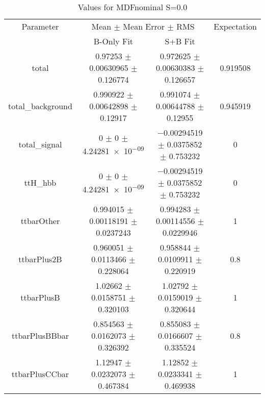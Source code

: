 \begin{table}
\centering
\caption{Values for MDFnominal S=0.0}
\begin{tabular}{cccc}
\toprule
Parameter & \multicolumn{2}{c}{Mean $\pm$ Mean Error $\pm$ RMS} & Expectation\\
 & B-Only Fit & S+B Fit & \\
\midrule
total & \num{0.97253} $\pm$ \num{0.00630965} $\pm$ \num{0.126774} & \num{0.972625} $\pm$ \num{0.00630383} $\pm$ \num{0.126657} & \num{0.919508}\\
total\_background & \num{0.990922} $\pm$ \num{0.00642898} $\pm$ \num{0.12917} & \num{0.991074} $\pm$ \num{0.00644788} $\pm$ \num{0.12955} & \num{0.945919}\\
total\_signal & \num{0} $\pm$ \num{0} $\pm$ \num{4.24281e-09} & \num{-0.00294519} $\pm$ \num{0.0375852} $\pm$ \num{0.753232} & \num{0}\\
ttH\_hbb & \num{0} $\pm$ \num{0} $\pm$ \num{4.24281e-09} & \num{-0.00294519} $\pm$ \num{0.0375852} $\pm$ \num{0.753232} & \num{0}\\
ttbarOther & \num{0.994015} $\pm$ \num{0.00118191} $\pm$ \num{0.0237243} & \num{0.994283} $\pm$ \num{0.00114556} $\pm$ \num{0.0229946} & \num{1}\\
ttbarPlus2B & \num{0.960051} $\pm$ \num{0.0113466} $\pm$ \num{0.228064} & \num{0.958844} $\pm$ \num{0.0109911} $\pm$ \num{0.220919} & \num{0.8}\\
ttbarPlusB & \num{1.02662} $\pm$ \num{0.0158751} $\pm$ \num{0.320103} & \num{1.02792} $\pm$ \num{0.0159019} $\pm$ \num{0.320644} & \num{1}\\
ttbarPlusBBbar & \num{0.854563} $\pm$ \num{0.0162073} $\pm$ \num{0.326392} & \num{0.855083} $\pm$ \num{0.0166607} $\pm$ \num{0.335524} & \num{0.8}\\
ttbarPlusCCbar & \num{1.12947} $\pm$ \num{0.0232073} $\pm$ \num{0.467384} & \num{1.12852} $\pm$ \num{0.0233341} $\pm$ \num{0.469938} & \num{1}\\
\bottomrule
\end{tabular}
\end{table}